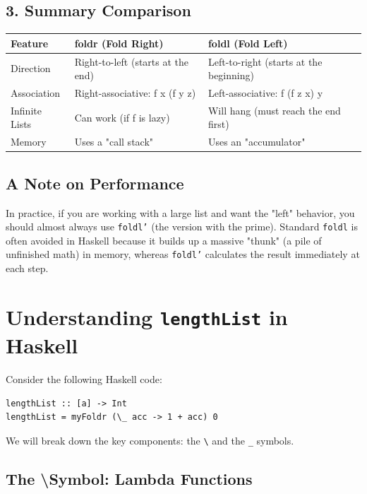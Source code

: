 \documentclass[12pt]{article}
\begin{document}
\subsection{3. Summary Comparison}

\begin{tabular}{|l|l|l|}
    \hline
    Feature        & foldr (Fold Right)                & foldl (Fold Left)                       \\
    \hline
    Direction      & Right-to-left (starts at the end) & Left-to-right (starts at the beginning) \\
    Association    & Right-associative: f x (f y z)    & Left-associative: f (f z x) y           \\
    Infinite Lists & Can work (if f is lazy)           & Will hang (must reach the end first)    \\
    Memory         & Uses a "call stack"               & Uses an "accumulator"                   \\
    \hline
\end{tabular}

\subsection*{A Note on Performance}
In practice, if you are working with a large list and want the "left" behavior, you should almost always use \texttt{foldl'} (the version with the prime). Standard \texttt{foldl} is often avoided in Haskell because it builds up a massive "thunk" (a pile of unfinished math) in memory, whereas \texttt{foldl'} calculates the result immediately at each step.






\section{Understanding \texttt{lengthList} in Haskell}

Consider the following Haskell code:

\begin{verbatim}
lengthList :: [a] -> Int
lengthList = myFoldr (\_ acc -> 1 + acc) 0
\end{verbatim}

We will break down the key components: the \texttt{\textbackslash} and the \texttt{\_} symbols.

\subsection{The \textbackslash Symbol: Lambda Functions}
\end{document}
